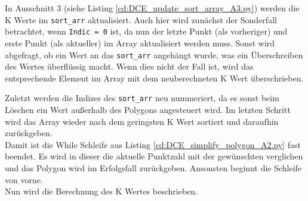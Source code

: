 {	

	In Ausschnitt 3 (siehe Listing \ref{cd:DCE_update_sort_array_A3.py}) werden die K Werte im \lstinline|sort_arr| aktualisiert. Auch hier wird zunächst der Sonderfall betrachtet, wenn \lstinline|Indic = 0| ist, da nun der letzte Punkt (als vorheriger) und erste Punkt (als aktueller) im Array aktualisiert werden muss. Sonst wird abgefragt, ob ein Wert an das \lstinline|sort_arr| angehängt wurde, was ein Überschreiben des Wertes überflüssig macht. Wenn dies nicht der Fall ist, wird das entsprechende Element im Array mit dem neuberechneten K Wert überschrieben.

	

	Zuletzt werden die Indizes des \lstinline|sort_arr| neu nummeriert, da es sonst beim Löschen ein Wert außerhalb des Polygons angesteuert wird.  Im letzten Schritt wird das Array wieder nach dem geringsten K Wert sortiert und daraufhin zurückgeben. \\
	Damit ist die While Schleife aus Listing \ref{cd:DCE_simplify_polygon_A2.py} fast beendet. Es wird in dieser die aktuelle Punktzahl mit der gewünschten verglichen und das Polygon wird im Erfolgsfall zurückgeben. Ansonsten beginnt die Schleife von vorne. \\
	Nun wird die Berechnung des K Wertes beschrieben.

	

}
